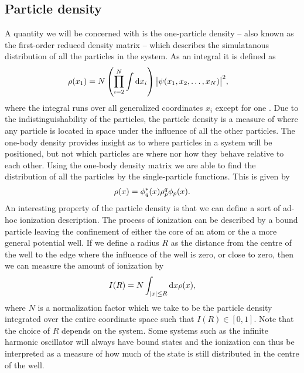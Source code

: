        \subsection{Particle density}
            \label{subsec:particle-density}
            A quantity we will be concerned with is the one-particle density --
            also known as the first-order reduced density matrix -- which
            describes the simulatanous distribution of all the particles in the
            system.
            As an integral it is defined as
            \begin{align}
                \rho(x_1)
                &= N\left( \prod_{i = 2}^{N} \int \dd x_i \right)
                \abs{\psi(x_1, x_2, \dots, x_N)}^2,
            \end{align}
            where the integral runs over all generalized coordinates $x_i$
            except for one \cite{lowdin-density-matrices, hogberget2013quantum}.
            Due to the indistinguishability of the particles, the particle
            density is a measure of where any particle is located in space under
            the influence of all the other particles.
            The one-body density provides insight as to where particles in a
            system will be positioned, but not which particles are where nor how
            they behave relative to each other.
            Using the one-body density matrix we are able to find the
            distribution of all the particles by the single-particle functions.
            This is given by
            \begin{align}
                \rho(x)
                =
                \phi^{*}_q(x) \rho^{q}_{p} \phi_p(x).
                \label{eq:particle-density}
            \end{align}
            An interesting property of the particle density is that we can
            define a sort of ad-hoc ionization description.
            The process of ionization can be described by a bound particle
            leaving the confinement of either the core of an atom or the a more
            general potential well.
            If we define a radius $R$ as the distance from the centre of the
            well to the edge where the influence of the well is zero, or close
            to zero, then we can measure the amount of ionization by
            \begin{align}
                I(R) = N\int_{\abs{x} \leq R}\dd x\rho(x),
            \end{align}
            where $N$ is a normalization factor which we take to be the particle
            density integrated over the entire coordinate space such that $I(R)
            \in [0, 1]$.
            Note that the choice of $R$ depends on the system.
            Some systems such as the infinite harmonic oscillator will always
            have bound states and the ionization can thus be interpreted as a
            measure of how much of the state is still distributed in the centre
            of the well.

